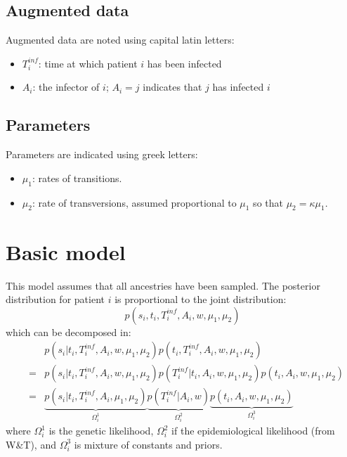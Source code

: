 \documentclass[10pt]{article}
\begin{document}
\subsection*{Augmented data}
Augmented data are noted using capital latin letters:
\begin{itemize}
	\item $T_i^{inf}$: time at which patient $i$ has been infected
	\item $A_i$: the infector of $i$; $A_i=j$ indicates that $j$ has infected $i$
\end{itemize}



\subsection*{Parameters}
Parameters are indicated using greek letters:
\begin{itemize}
	\item $\mu_1$: rates of transitions.
	\item $\mu_2 $: rate of transversions, assumed proportional to $\mu_1$ so that $\mu_2 = \kappa \mu_1$.
\end{itemize}






\section*{Basic model}
This model assumes that all ancestries have been sampled.
The posterior distribution for patient $i$ is proportional to the joint distribution:
\begin{equation}
 p(s_i, t_i, T_i^{inf}, A_i, w, \mu_1, \mu_2)
\end{equation}
which can be decomposed in:
\begin{eqnarray}
& & p(s_i | t_i, T_i^{inf}, A_i, w, \mu_1, \mu_2)  p(t_i, T_i^{inf}, A_i, w, \mu_1, \mu_2)\\
&=& p(s_i | t_i, T_i^{inf}, A_i, w, \mu_1, \mu_2)  p(T_i^{inf} | t_i, A_i, w, \mu_1, \mu_2) p(t_i, A_i, w, \mu_1, \mu_2)\\
&=& \underbrace{p(s_i | t_i, T_i^{inf}, A_i, \mu_1, \mu_2)}_{\Omega_i^1}  
    \underbrace{p(T_i^{inf} | A_i, w)}_{\Omega_i^2}
    \underbrace{p(t_i, A_i, w, \mu_1, \mu_2)}_{\Omega_i^3} 
\end{eqnarray}
\noindent where $\Omega_i^1$ is the genetic likelihood, $\Omega_i^2$ if the epidemiological likelihood (from W\&T), and $\Omega_i^3$ is mixture of constants and priors.
\\
\end{document}
